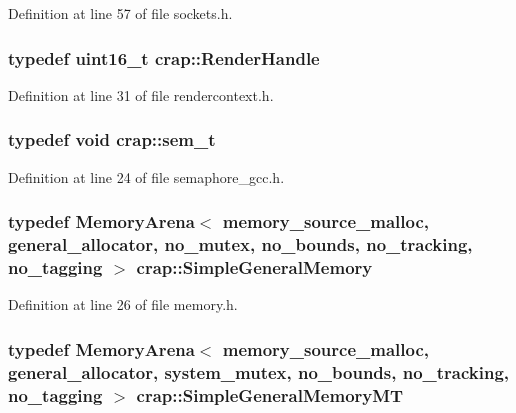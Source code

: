 Definition at line 57 of file sockets.\+h.

\hypertarget{namespacecrap_abc80287e8f903e84b76fec4c44671533}{}
\subsubsection[{Render\+Handle}]{\setlength{\rightskip}{0pt plus 5cm}typedef uint16\+\_\+t {\bf crap\+::\+Render\+Handle}}\label{namespacecrap_abc80287e8f903e84b76fec4c44671533}


Definition at line 31 of file rendercontext.\+h.

\hypertarget{namespacecrap_a8389bdde2ea5b1b5884c12d7f82c0e39}{}
\subsubsection[{sem\+\_\+t}]{\setlength{\rightskip}{0pt plus 5cm}typedef void {\bf crap\+::sem\+\_\+t}}\label{namespacecrap_a8389bdde2ea5b1b5884c12d7f82c0e39}


Definition at line 24 of file semaphore\+\_\+gcc.\+h.

\hypertarget{namespacecrap_a0f685df0fdfec9a4cbf9aaeab41a73a5}{}
\subsubsection[{Simple\+General\+Memory}]{\setlength{\rightskip}{0pt plus 5cm}typedef {\bf Memory\+Arena}$<$ {\bf memory\+\_\+source\+\_\+malloc}, {\bf general\+\_\+allocator}, {\bf no\+\_\+mutex}, {\bf no\+\_\+bounds}, {\bf no\+\_\+tracking}, {\bf no\+\_\+tagging} $>$ {\bf crap\+::\+Simple\+General\+Memory}}\label{namespacecrap_a0f685df0fdfec9a4cbf9aaeab41a73a5}


Definition at line 26 of file memory.\+h.

\hypertarget{namespacecrap_a8c3afedb9f5acb5aa0e4e2767ccf0118}{}
\subsubsection[{Simple\+General\+Memory\+M\+T}]{\setlength{\rightskip}{0pt plus 5cm}typedef {\bf Memory\+Arena}$<$ {\bf memory\+\_\+source\+\_\+malloc}, {\bf general\+\_\+allocator}, {\bf system\+\_\+mutex}, {\bf no\+\_\+bounds}, {\bf no\+\_\+tracking}, {\bf no\+\_\+tagging} $>$ {\bf crap\+::\+Simple\+General\+Memory\+M\+T}}\label{namespacecrap_a8c3afedb9f5acb5aa0e4e2767ccf0118}


